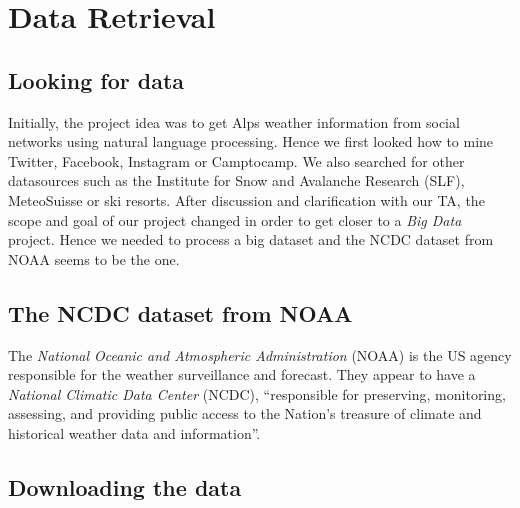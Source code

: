 \section{Data Retrieval}
\subsection{Looking for data}
Initially, the project idea was to get Alps weather information from social networks using natural language processing. Hence we first looked how to mine Twitter, Facebook, Instagram or Camptocamp. We also searched for other datasources such as the Institute for Snow and Avalanche Research (SLF), MeteoSuisse or ski resorts. After discussion and clarification with our TA, the scope and goal of our project changed in order to get closer to a \emph{Big Data} project. Hence we needed to process a big dataset and the NCDC dataset from NOAA seems to be the one.

\subsection{The NCDC dataset from NOAA}
The \emph{National Oceanic and Atmospheric Administration} (NOAA) is the US agency responsible for the weather surveillance and forecast. They appear to have a \emph{National Climatic Data Center} (NCDC), “responsible for preserving, monitoring, assessing, and providing public access to the Nation's treasure of climate and historical weather data and information”.

\subsection{Downloading the data}